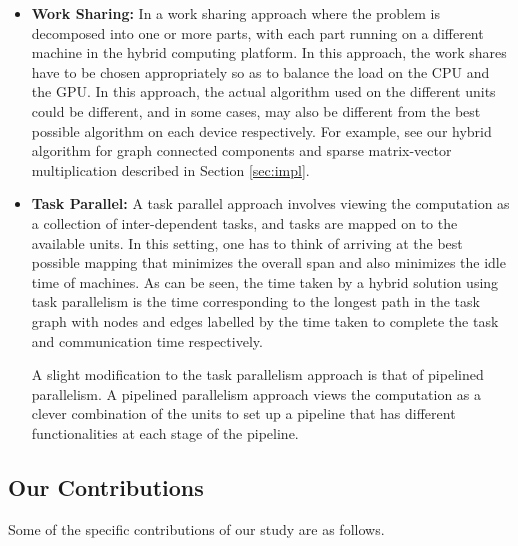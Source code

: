 \documentclass[11pt]{article}
\newcommand{\ignore}[1] {}
\newcommand{\spmv} {{\tt spmv}}
\begin{document}
\begin{itemize}
\item {\bf Work Sharing:} In a work sharing approach where the problem is 
decomposed into one or more parts, with each part running on a different 
machine in the hybrid computing platform. In this approach, the work shares
have to be chosen appropriately so as to balance the load on the CPU and the
GPU. In this approach, the actual  algorithm used on the  different units
could be different, and in some  cases, may also be different from the best
possible algorithm on each  device respectively. For example, see our hybrid
algorithm for graph connected components and sparse matrix-vector
multiplication described in Section \ref{sec:impl}.
\ignore{(For instance, consider the \spmv$\;$ kernel which involves
multiplying a sparse matrix with a vector to produce another vector.
The best hybrid algorithm may actually assign rows that the CPU is
good at working with to the CPU and vice-versa on the GPU. This may
be different from the best possible pure CPU/GPU algorithm which has
to compute on all rows.)}

\item {\bf Task Parallel:}  A task parallel approach involves viewing the 
computation as a collection of inter-dependent tasks, and tasks are 
mapped on to the available units. In this setting, one has to think of
arriving at the best possible mapping that minimizes the overall span and 
also minimizes the idle time of machines. As can be seen, the time taken 
by a hybrid solution using task parallelism is the time corresponding to 
the longest path in the task graph with nodes and edges labelled by the time
taken to complete the task and communication time respectively.

A slight modification to the task parallelism approach is that of pipelined
parallelism.
A pipelined parallelism approach views the computation as a 
clever combination of the units to set up a pipeline that has
different functionalities at each stage of the pipeline. 
\end{itemize}


\subsection{Our Contributions}

Some of the specific contributions of our study are as follows.
\end{document}
